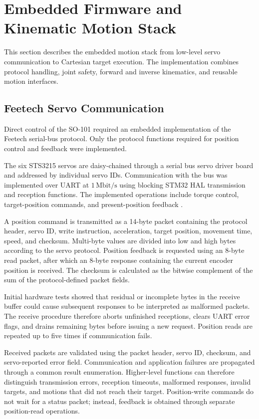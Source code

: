\section{Embedded Firmware and Kinematic Motion Stack}

This section describes the embedded motion stack from low-level servo communication to Cartesian target execution. The implementation combines protocol handling, joint safety, forward and inverse kinematics, and reusable motion interfaces.

\subsection{Feetech Servo Communication}

Direct control of the SO-101 required an embedded implementation of the Feetech serial-bus protocol. Only the protocol functions required for position control and feedback were implemented.

The six STS3215 servos are daisy-chained through a serial bus servo driver board and addressed by individual servo IDs. Communication with the bus was implemented over UART at \(1\,\mathrm{Mbit/s}\) using blocking STM32 HAL transmission and reception functions. The implemented operations include torque control, target-position commands, and present-position feedback \cite{feetech_protocol}.

A position command is transmitted as a 14-byte packet containing the protocol header, servo ID, write instruction, acceleration, target position, movement time, speed, and checksum. Multi-byte values are divided into low and high bytes according to the servo protocol. Position feedback is requested using an 8-byte read packet, after which an 8-byte response containing the current encoder position is received. The checksum is calculated as the bitwise complement of the sum of the protocol-defined packet fields.

Initial hardware tests showed that residual or incomplete bytes in the receive buffer could cause subsequent responses to be interpreted as malformed packets. The receive procedure therefore aborts unfinished receptions, clears UART error flags, and drains remaining bytes before issuing a new request. Position reads are repeated up to five times if communication fails.

Received packets are validated using the packet header, servo ID, checksum, and servo-reported error field. Communication and application failures are propagated through a common result enumeration. Higher-level functions can therefore distinguish transmission errors, reception timeouts, malformed responses, invalid targets, and motions that did not reach their target. Position-write commands do not wait for a status packet; instead, feedback is obtained through separate position-read operations.

